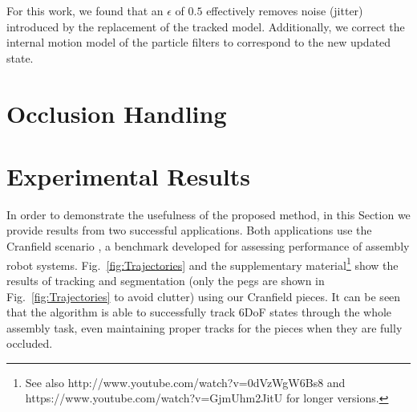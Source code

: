 For this work, we found that an $\epsilon$ of $0.5$ effectively removes noise (jitter) introduced by the replacement of the tracked model. Additionally, we correct the internal motion model of the particle filters to correspond to the new updated state.

\section{Occlusion Handling}
\section{Experimental Results}
In order to demonstrate the usefulness of the proposed method, in this Section we provide results from two successful applications. Both applications use the Cranfield scenario \cite{collins1984development}, a benchmark developed for assessing performance of assembly robot systems. Fig.~\ref{fig:Trajectories} and the supplementary material\footnote{See also http://www.youtube.com/watch?v=0dVzWgW6Bs8 and https://www.youtube.com/watch?v=GjmUhm2JitU for longer versions.} show the results of tracking and segmentation (only the pegs are shown in Fig.~\ref{fig:Trajectories} to avoid clutter) using our Cranfield pieces. It can be seen that the algorithm is able to successfully track 6DoF states through the whole assembly task, even maintaining proper tracks for the pieces when they are fully occluded.

